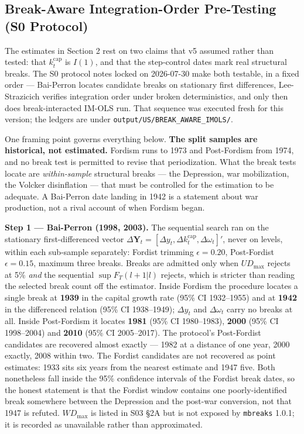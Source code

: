 \documentclass[11pt,a4paper]{article}
\begin{document}
\subsection{Break-Aware Integration-Order Pre-Testing (S0\* Protocol)}

The estimates in Section 2 rest on two claims that v5 assumed rather than tested: that $k_t^{\text{cap}}$ is $I(1)$, and that the step-control dates mark real structural breaks. The S0\* protocol notes locked on 2026-07-30 make both testable, in a fixed order --- Bai-Perron locates candidate breaks on stationary first differences, Lee-Strazicich verifies integration order under broken deterministics, and only then does break-interacted IM-OLS run. That sequence was executed fresh for this version; the ledgers are under \texttt{output/US/BREAK\_AWARE\_IMOLS/}.

One framing point governs everything below. \textbf{The split samples are historical, not estimated.} Fordism runs to 1973 and Post-Fordism from 1974, and no break test is permitted to revise that periodization. What the break tests locate are \textit{within-sample} structural breaks --- the Depression, war mobilization, the Volcker disinflation --- that must be controlled for the estimation to be adequate. A Bai-Perron date landing in 1942 is a statement about war production, not a rival account of when Fordism began.

\noindent\textbf{Step 1 --- Bai-Perron (1998, 2003).} The sequential search ran on the stationary first-differenced vector $\Delta\mathbf{Y}_t = [\Delta y_t, \Delta k_t^{\text{cap}}, \Delta\omega_t]'$, never on levels, within each sub-sample separately: Fordist trimming $\epsilon = 0.20$, Post-Fordist $\epsilon = 0.15$, maximum three breaks. Breaks are admitted only when $UD_{\max}$ rejects at 5\% \textit{and} the sequential $\sup F_T(l+1|l)$ rejects, which is stricter than reading the selected break count off the estimator. Inside Fordism the procedure locates a single break at \textbf{1939} in the capital growth rate (95\% CI 1932--1955) and at \textbf{1942} in the differenced relation (95\% CI 1938--1949); $\Delta y_t$ and $\Delta\omega_t$ carry no breaks at all. Inside Post-Fordism it locates \textbf{1981} (95\% CI 1980--1983), \textbf{2000} (95\% CI 1998--2004) and \textbf{2010} (95\% CI 2005--2017). The protocol's Post-Fordist candidates are recovered almost exactly --- 1982 at a distance of one year, 2000 exactly, 2008 within two. The Fordist candidates are not recovered as point estimates: 1933 sits six years from the nearest estimate and 1947 five. Both nonetheless fall inside the 95\% confidence intervals of the Fordist break dates, so the honest statement is that the Fordist window contains one poorly-identified break somewhere between the Depression and the post-war conversion, not that 1947 is refuted. $WD_{\max}$ is listed in S03 \S2A but is not exposed by \texttt{mbreaks} 1.0.1; it is recorded as unavailable rather than approximated.
\end{document}
